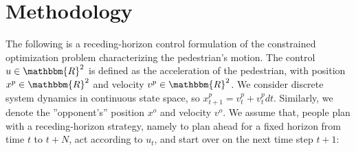 \documentclass[conference]{IEEEtran}
\begin{document}
\section{Methodology}
\vspace{-0.1em}
The following is a receding-horizon control formulation of the constrained 
optimization problem characterizing the pedestrian's motion. The control 
$u \in \mathbbm{R}^2$ 
is defined as the acceleration of the pedestrian, with 
position $x^p \in \mathbbm{R}^2$ and velocity $v^p \in \mathbbm{R}^2$. We  
consider
discrete system dynamics in continuous state space, so $x_{t+1}^p = v_t^p + v_t^p dt$.
Similarly, we denote the ''opponent's'' position $x^o$ and velocity $v^o$. We assume that, 
people plan with a receding-horizon strategy, namely to plan ahead for a fixed 
horizon from time $t$ to $t+N$, act according to $u_t$, and start over on the 
next time step $t+1$:
\end{document}
